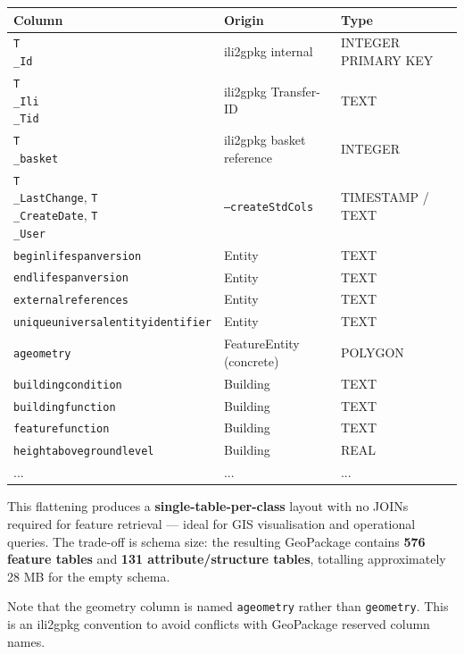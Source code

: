\documentclass[conference]{IEEEtran}
\begin{document}
\begin{center}
\begin{longtable}{p{}p{}p{}}
Column & Origin & Type \\
\midrule
\texttt{T\\_Id} & ili2gpkg internal & INTEGER PRIMARY KEY \\
\texttt{T\\_Ili\\_Tid} & ili2gpkg Transfer-ID & TEXT \\
\texttt{T\\_basket} & ili2gpkg basket reference & INTEGER \\
\texttt{T\\_LastChange}, \texttt{T\\_CreateDate}, \texttt{T\\_User} & \texttt{--createStdCols} & TIMESTAMP / TEXT \\
\texttt{beginlifespanversion} & Entity & TEXT \\
\texttt{endlifespanversion} & Entity & TEXT \\
\texttt{externalreferences} & Entity & TEXT \\
\texttt{uniqueuniversalentityidentifier} & Entity & TEXT \\
\texttt{ageometry} & FeatureEntity (concrete) & POLYGON \\
\texttt{buildingcondition} & Building & TEXT \\
\texttt{buildingfunction} & Building & TEXT \\
\texttt{featurefunction} & Building & TEXT \\
\texttt{heightabovegroundlevel} & Building & REAL \\
... & ... & ... \\
\end{longtable}
\end{center}


This flattening produces a \textbf{single-table-per-class} layout with no JOINs required for feature retrieval — ideal for GIS visualisation and operational queries. The trade-off is schema size: the resulting GeoPackage contains \textbf{576 feature tables} and \textbf{131 attribute/structure tables}, totalling approximately 28 MB for the empty schema.

Note that the geometry column is named \texttt{ageometry} rather than \texttt{geometry}. This is an ili2gpkg convention to avoid conflicts with GeoPackage reserved column names.
\end{document}
